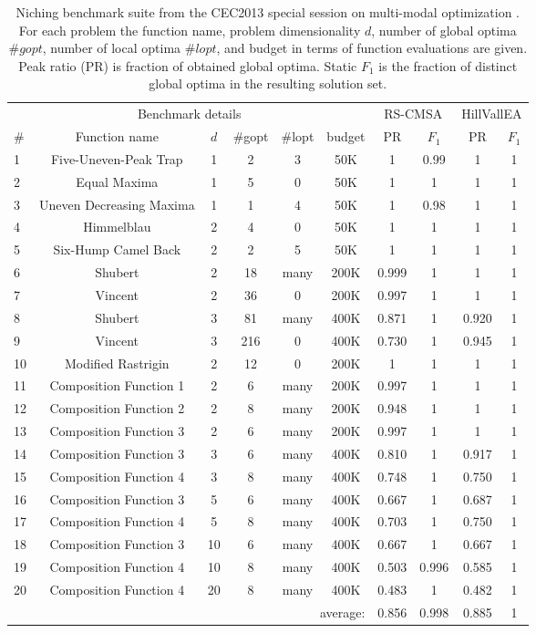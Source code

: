 \documentclass[10pt,a4paper, geometry, fullpage]{article}
\theoremstyle{plain}
\theoremstyle{remark}
\begin{document}
\begin{table}
\begin{center}
\small
\begin{tabular}{lccccc|cc|cc}
\toprule
\multicolumn{6}{c|}{Benchmark details} & \multicolumn{2}{c|}{RS-CMSA} & \multicolumn{2}{c}{HillVallEA} \\
\# & Function name & $d$ & \#gopt & \#lopt & budget & PR & $F_1$ & PR & $F_1$ \\
\toprule
1 & Five-Uneven-Peak Trap & 1 & 2 & 3 & 50K& 1& 0.99& 1 & 1  \\
2 & Equal Maxima & 1 & 5 & 0 & 50K& 1&1& 1 & 1  \\
3 & Uneven Decreasing Maxima & 1 & 1 & 4 & 50K&1& 0.98 & 1 & 1 \\
4 & Himmelblau & 2 & 4 & 0 & 50K &1  & 1&1 & 1 \\
5 & Six-Hump Camel Back & 2 & 2 & 5 & 50K& 1&1& 1 & 1  \\
6 & Shubert & 2 & 18 & many & 200K & 0.999 &1&  1 & 1  \\
7 & Vincent & 2 & 36 & 0 & 200K & 0.997 &1& 1 & 1\\
8 & Shubert & 3 & 81 & many & 400K & 0.871 & 1&0.920 & 1 \\
9 & Vincent & 3 & 216 & 0 & 400K & 0.730 &1& 0.945 & 1 \\
10 & Modified Rastrigin & 2 & 12 & 0 & 200K & 1 &1& 1 & 1 \\
11 & Composition Function 1 & 2 & 6 & many &200K & 0.997 &1& 1 & 1\\
12 & Composition Function 2 & 2 & 8 &many & 200K & 0.948 &1& 1 & 1\\
13 & Composition Function 3 & 2 & 6 &many & 200K & 0.997 &1& 1 & 1 \\
14 & Composition Function 3 & 3 & 6 &many & 400K & 0.810 & 1&0.917 & 1 \\
15 & Composition Function 4 & 3 & 8 &many & 400K & 0.748 &1& 0.750 & 1 \\
16 & Composition Function 3 & 5 & 6 &many & 400K & 0.667 &1& 0.687 & 1\\
17 & Composition Function 4 & 5 & 8 &many & 400K & 0.703 &1& 0.750 & 1\\
18 & Composition Function 3 & 10 & 6 & many &400K & 0.667 &1& 0.667 & 1 \\
19 & Composition Function 4 & 10 & 8 &many & 400K & 0.503 & 0.996 & 0.585 & 1 \\
20 & Composition Function 4 & 20 & 8 &many & 400K & 0.483 &1& 0.482 &1\\
\bottomrule 
\multicolumn{6}{r|}{average:} & 0.856 &  0.998 & 0.885 & 1 \\
\end{tabular}
\caption{Niching benchmark suite from the CEC2013 special session on multi-modal optimization \cite{CEC2013NichingCompetition}. For each problem the function name, problem dimensionality $d$, number of global optima $\#gopt$, number of local optima $\#lopt$, and budget in terms of function evaluations are given. Peak ratio (PR) is fraction of obtained global optima. Static $F_1$ is the fraction of distinct global optima in the resulting solution set.}
\label{tab:2dbenchmarks}
\end{center}
\end{table}
\end{document}
